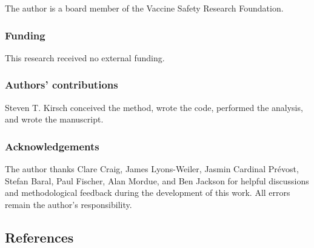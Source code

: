 \documentclass[
]{article}
\begin{document}
The author is a board member of the Vaccine Safety Research Foundation.

\subsubsection{Funding}\label{funding}

This research received no external funding.

\subsubsection{Authors' contributions}\label{authors-contributions}

Steven T. Kirsch conceived the method, wrote the code, performed the analysis, and wrote the manuscript.

\subsubsection{Acknowledgements}\label{acknowledgements}

The author thanks Clare Craig, James Lyons-Weiler, Jasmin Cardinal Prévost, Stefan Baral, Paul Fischer, Alan Mordue, and Ben Jackson for helpful discussions and methodological feedback during the development of this work. All errors remain the author's responsibility.

\newpage

\subsection{References}\label{references}
\end{document}
